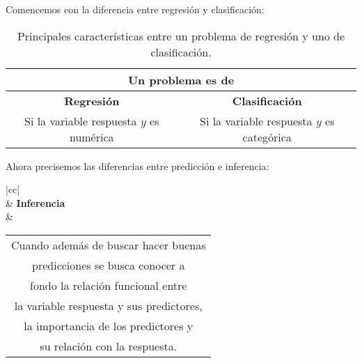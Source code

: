 \documentclass[a4paper,11pt]{article}
\begin{document}
\begin{enumerate}
{\begin{shaded}
        Comencemos con la diferencia entre regresión y 
        clasificación:
        \begin{table}[H]
            \centering
            \begin{tabular}{|cc|}
                \hline
                \multicolumn{2}{|c|}{Un problema es de} \\ \hline
                \multicolumn{1}{|c|}{\textbf{Regresión}} & 
                \textbf{Clasificación} \\ \hline
                \multicolumn{1}{|c|}{Si la variable respuesta
                $y$ es numérica}   & Si la variable respuesta
                $y$ es categórica \\ \hline
            \end{tabular}
            \caption{Principales características entre un 
            problema de regresión y uno de clasificación.}
        \end{table}
        Ahora precisemos las diferencias entre predicción e 
        inferencia:
        \begin{table}[H]
            \centering
            \begin{tabular}{|cc|}
            \hline
            \\ \hline
             & 
            \textbf{Inferencia}\\ \hline
             & 
            \begin{tabular}[c]{@{}c@{}}Cuando además de buscar 
            hacer buenas\\ predicciones se busca conocer a\\ 
            fondo la relación funcional entre\\ la variable 
            respuesta y sus predictores,\\ la importancia de los 
            predictores y\\ su relación con la respuesta.
            \end{tabular} \\ \hline

\end{tabular}
\end{table}
\end{shaded}}
\end{enumerate}
\end{document}
